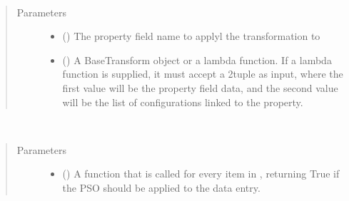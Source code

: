 \documentclass[letterpaper,10pt,english]{sphinxmanual}
\begin{document}
\begin{fulllineitems}

\begin{fulllineitems}
\label{\detokenize{dataset:colabfit.tools.dataset.Dataset.apply_transformation}}~\begin{quote}\begin{description}
\item[{Parameters}] \leavevmode\begin{itemize}
\item {} 
\sphinxAtStartPar
{} () \textendash{} The property field name to applyl the transformation to

\item {} 
\sphinxAtStartPar
{} () \textendash{} A BaseTransform object or a lambda function. If a lambda
function is supplied, it must accept a 2\sphinxhyphen{}tuple as input, where
the first value will be the property field data, and the second
value will be the list of configurations linked to the property.

\end{itemize}

\end{description}\end{quote}

\end{fulllineitems}


\begin{fulllineitems}
\label{\detokenize{dataset:colabfit.tools.dataset.Dataset.attach_configuration_labels}}~\begin{quote}\begin{description}
\item[{Parameters}] \leavevmode\begin{itemize}
\item {} 
\sphinxAtStartPar
{} () \textendash{} A function that is called for every item in
, returning True if the PSO should be
applied to the data entry.


\end{itemize}
\end{description}
\end{quote}
\end{fulllineitems}
\end{fulllineitems}
\end{document}
